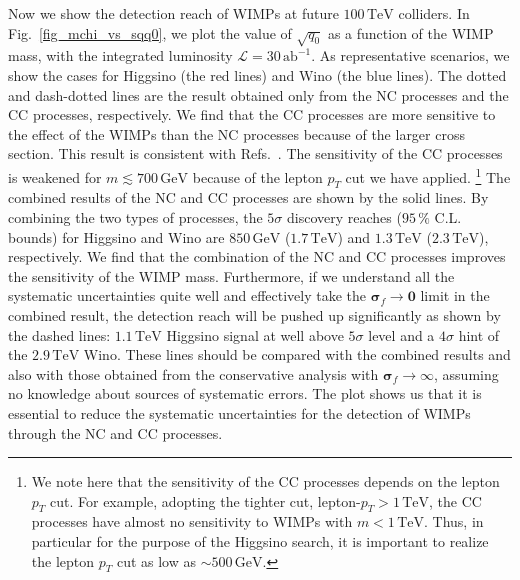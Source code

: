 \documentclass[12pt,twoside,book]{article}
\begin{document}
Now we show the detection reach of WIMPs at future $100\,\mathrm{TeV}$ colliders.
In Fig.~\ref{fig_mchi_vs_sqq0}, we plot the value of $\sqrt{q_0}$ as a function of the WIMP mass, with the integrated luminosity $\mathcal{L}=30\,\mathrm{ab}^{-1}$.
As representative scenarios, we show the cases for Higgsino (the red lines) and Wino (the blue lines).
The dotted and dash-dotted lines are the result obtained only from the NC processes and the CC processes, respectively.
We find that the CC processes are more sensitive to the effect of the WIMPs than the NC processes because of the larger cross section.
This result is consistent with Refs.~\cite{DiLuzio:2018jwd,Matsumoto:2018ioi}.
The sensitivity of the CC processes is weakened for $m \lesssim 700\, \mathrm{GeV}$ because of the lepton $p_T$ cut we have applied.
\footnote{
  We note here that the sensitivity of the CC processes depends on the lepton $p_T$ cut.
  For example, adopting the tighter cut, lepton-$p_T > 1\,\mathrm{TeV}$, the CC processes have almost no sensitivity to WIMPs with $m < 1\,\mathrm{TeV}$.
  Thus, in particular for the purpose of the Higgsino search, it is important to realize the lepton $p_T$ cut as low as $\sim 500\, \mathrm{GeV}$.
}
The combined results of the NC and CC processes are shown by the solid lines.
By combining the two types of processes, the $5\sigma$ discovery reaches ($95\,\%$ C.L. bounds) for Higgsino and Wino are $850\,\mathrm{GeV}$ ($1.7\,\mathrm{TeV}$) and $1.3\,\mathrm{TeV}$ ($2.3\,\mathrm{TeV}$), respectively.
We find that the combination of the NC and CC processes improves the sensitivity of the WIMP mass.
Furthermore, if we understand all the systematic uncertainties quite well and effectively take the $\bm{\sigma}_f \to \bm{0}$ limit in the combined result, the detection reach will be pushed up significantly as shown by the dashed lines: $1.1\,\mathrm{TeV}$ Higgsino signal at well above $5\sigma$ level and a $4\sigma$ hint of the $2.9\,\mathrm{TeV}$ Wino.
These lines should be compared with the combined results and also with those obtained from the conservative analysis with $\bm{\sigma}_f \to \infty$, assuming no knowledge about sources of systematic errors.
The plot shows us that it is essential to reduce the systematic uncertainties for the detection of WIMPs through the NC and CC processes.
\end{document}
